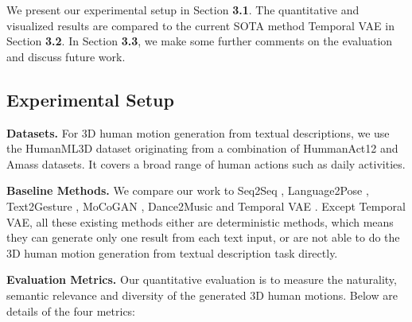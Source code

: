 \documentclass{article}
\begin{document}
We present our experimental setup in Section \textbf{3.1}. The quantitative and visualized results are compared to the current SOTA method Temporal VAE \cite{guo2022generating} in Section \textbf{3.2}. In Section \textbf{3.3}, we make some further comments on the evaluation and discuss future work.

\subsection{Experimental Setup}

\noindent \textbf{Datasets.} For 3D human motion generation from textual descriptions, we use the HumanML3D \cite{guo2022generating} dataset originating from a combination of HummanAct12 \cite{guo2020action2motion} and Amass \cite{mahmood2019amass} datasets. It covers a broad range of human actions such as daily activities.

\noindent \textbf{Baseline Methods.} We compare our work to Seq2Seq \cite{linvigil18}, Language2Pose \cite{ahuja2019language2pose}, Text2Gesture \cite{bhattacharya2021text2gestures}, MoCoGAN \cite{tulyakov2018mocogan}, Dance2Music \cite{tang2018dance} and Temporal VAE \cite{guo2022generating}. Except Temporal VAE, all these existing methods either are deterministic methods, which means they can generate only one result from each text input, or are not able to do the 3D human motion generation from textual description task directly. 

\noindent \textbf{Evaluation Metrics.} Our quantitative evaluation is to measure the naturality, semantic relevance and diversity of the generated 3D human motions. Below are details of the four metrics:
\end{document}
